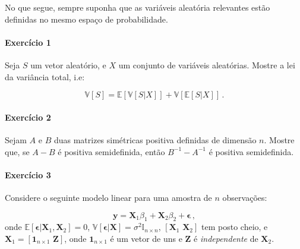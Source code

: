 \documentclass[10pt,a4paper]{article}
\title{}
\author{\normalsize Exercícios sobre Estimação por MQO}
\date{}
\begin{document}
	\maketitle
	No que segue, sempre suponha que as variáveis aleatória relevantes estão definidas no mesmo espaço de probabilidade.
 \paragraph{Exercício 1} Seja $S$ um vetor aleatório, e $X$ um conjunto de variáveis aleatórias. Mostre a lei da variância total, i.e:
 
 $$\mathbb{V}[S] = \mathbb{E}[\mathbb{V}[S|X]] + \mathbb{V}[\mathbb{E}[S|X]]\, .$$

 \paragraph{Exercício 2} Sejam $A$ e $B$ duas matrizes simétricas positiva definidas de dimensão $n$. Mostre que, se $A-B$ é positiva semidefinida, então $B^{-1} - A^{-1}$ é positiva semidefinida.
 
 \paragraph{Exercício 3} Considere o seguinte modelo linear para uma amostra de $n$ observações:
 
 $$\boldsymbol{y} = \boldsymbol{X}_1 \beta_1 + \boldsymbol{X}_2 \beta_2 + \boldsymbol{\epsilon}\,,$$
 onde $\mathbb{E}[\boldsymbol{\epsilon}|\boldsymbol{X}_1,\boldsymbol{X}_2]=0$, $\mathbb{V}[\boldsymbol{\epsilon}|\boldsymbol{X}]=\sigma^2\mathbb{I}_{n\times n}$, $\left[\boldsymbol{X}_1 \, \, \boldsymbol{X}_2\right]$ tem posto cheio, e $\boldsymbol{X}_1 = \left[ \boldsymbol{1}_{n\times 1} \, \, \boldsymbol{Z}\right]$, onde  $\boldsymbol{1}_{n\times 1}  $ é um vetor de uns e $\boldsymbol{Z}$ é \emph{independente} de $\boldsymbol{X}_2$.
 
\end{document}
